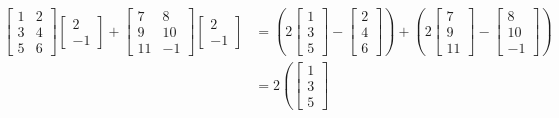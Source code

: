 \documentclass{ximera}
\begin{document}
\begin{equation*}
    \begin{split}
        \begin{bmatrix}
            1 & 2 \\
            3 & 4 \\
            5 & 6
        \end{bmatrix}
        \begin{bmatrix}
            2 \\ 
            -1
        \end{bmatrix}
        +
        \begin{bmatrix}
            7 & 8 \\
            9 & 10 \\
            11 & -1
        \end{bmatrix}
        \begin{bmatrix}
            2 \\ 
            -1
        \end{bmatrix}
        & =
        \left(
            2
            \begin{bmatrix}
                1 \\
                3 \\
                5
            \end{bmatrix}
            -
            \begin{bmatrix}
                2 \\
                4 \\
                6
            \end{bmatrix}
        \right)
        + \left( 2
            \begin{bmatrix}
                7 \\
                9 \\
                11
            \end{bmatrix}
            -
            \begin{bmatrix}
                8 \\
                10 \\
                -1
            \end{bmatrix}
        \right) \\
        & = 2
        \left(
            \begin{bmatrix}
                1 \\
                3 \\
                5
            \end{bmatrix}

\end{split}
\end{equation*}
\end{document}
